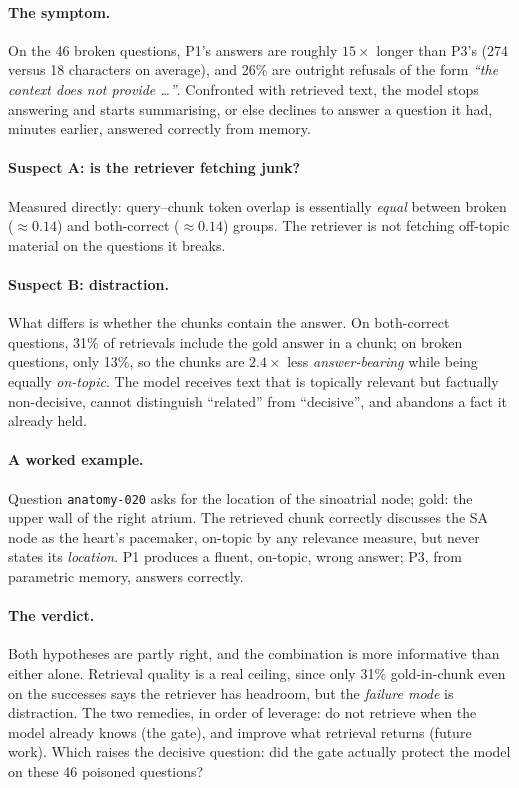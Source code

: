 \paragraph{The symptom.} On the 46 broken questions, P1's answers are roughly
$15\times$ longer than P3's (274 versus 18 characters on average), and 26\%
are outright refusals of the form \emph{``the context does not provide
\ldots''}. Confronted with retrieved text, the model stops answering and
starts summarising, or else declines to answer a question it had, minutes
earlier, answered correctly from memory.

\paragraph{Suspect A: is the retriever fetching junk?} Measured directly:
query--chunk token overlap is essentially \emph{equal} between broken
($\approx 0.14$) and both-correct ($\approx 0.14$) groups. The retriever is
not fetching off-topic material on the questions it breaks.

\paragraph{Suspect B: distraction.} What differs is whether the chunks
contain the answer. On both-correct questions, 31\% of retrievals include
the gold answer in a chunk; on broken questions, only 13\%, so the chunks
are $2.4\times$ less \emph{answer-bearing} while being equally
\emph{on-topic}. The model receives text that is topically relevant but
factually non-decisive, cannot distinguish ``related'' from ``decisive'',
and abandons a fact it already held.

\paragraph{A worked example.} Question \texttt{anatomy-020} asks for the
location of the sinoatrial node; gold: the upper wall of the right atrium.
The retrieved chunk correctly discusses the SA node as the heart's pacemaker,
on-topic by any relevance measure, but never states its
\emph{location}. P1 produces a fluent, on-topic, wrong answer; P3, from
parametric memory, answers correctly.

\paragraph{The verdict.} Both hypotheses are partly right, and the
combination is more informative than either alone. Retrieval quality is a
real ceiling, since only 31\% gold-in-chunk even on the successes says the
retriever has headroom, but the \emph{failure mode} is distraction. The
two remedies, in order of leverage: do not retrieve when the model already
knows (the gate), and improve what retrieval returns (future work). Which
raises the decisive question: did the gate actually protect the model on
these 46 poisoned questions?

